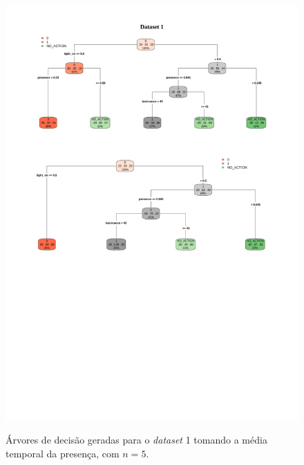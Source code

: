 \begin{figure}[hp]
	\centering
	\caption{Árvores de decisão geradas para o \textit{dataset} 1 tomando a média temporal da presença, com $n=5$.}
  \includegraphics[width=\textwidth]{imagens/teste_learning/5_1.pdf}
  \label{fig:teste_5_1}  
\end{figure}


